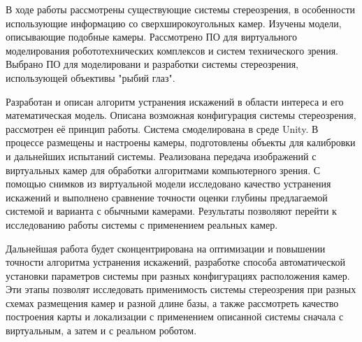 
В ходе работы рассмотрены существующие системы стереозрения, в особенности использующие информацию
со сверхширокоугольных камер. Изучены модели, описывающие подобные камеры. Рассмотрено ПО для виртуального
 моделирования робототехнических комплексов и систем технического зрения. Выбрано ПО для моделировани и 
разработки системы стереозрения, использующей объективы "рыбий глаз". 

Разработан и описан алгоритм устранения искажений в области интереса и его математическая модель.   %
Описана возможная конфигурация системы стереозрения, рассмотрен её принцип работы. Система 
 смоделирована в среде Unity. В процессе размещены и настроены камеры, подготовлены объекты для калибровки и 
дальнейших испытаний системы. Реализована передача изображений с виртуальных камер для обработки алгоритмами
компьютерного зрения. С помощью снимков из виртуальной модели исследовано качество устранения искажений и выполнено
 сравнение точности оценки глубины предлагаемой системой и варианта с обычными камерами. Результаты позволяют 
 перейти к исследованию работы системы с применением реальных камер.  %

Дальнейшая работа будет сконцентрирована на оптимизации и повышении точности алгоритма устранения искажений,
разработке способа автоматической установки параметров системы при разных конфигурациях расположения камер. 
Эти этапы позволят исследовать применимость системы стереозрения при  разных схемах размещения камер и разной 
длине базы, а также рассмотреть качество построения карты и локализации с применением описанной 
системы сначала с виртуальным, а затем и с реальном роботом.